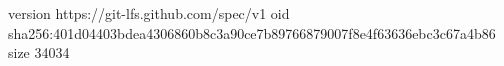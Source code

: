 version https://git-lfs.github.com/spec/v1
oid sha256:401d04403bdea4306860b8c3a90ce7b89766879007f8e4f63636ebc3c67a4b86
size 34034
